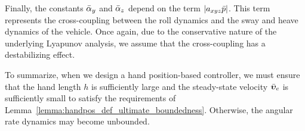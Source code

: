 Finally, the constants $\Bar{\alpha}_y$ and $\Bar{\alpha}_z$ depend on the term $\left|a_{xyz}\Bar{p}\right|$.
This term represents the cross-coupling between the roll dynamics and the sway and heave dynamics of the vehicle.
Once again, due to the conservative nature of the underlying Lyapunov analysis, we assume that the cross-coupling has a destabilizing effect.

To summarize, when we design a hand position-based controller, we must ensure that the hand length $h$ is sufficiently large and the steady-state velocity $\Bar{\bm{\upsilon}}_e$ is sufficiently small to satisfy the requirements of Lemma~\ref{lemma:handpos_def_ultimate_boundedness}.
Otherwise, the angular rate dynamics may become unbounded.
